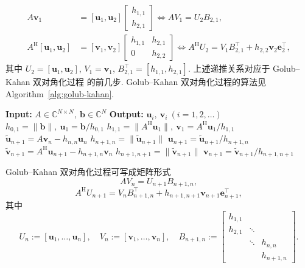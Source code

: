 \[\begin{aligned}A\bm v_1&=[\bm u_1,\bm u_2]\begin{bmatrix}h_{1,1}\\h_{2,1}\end{bmatrix}\Leftrightarrow AV_1=U_2B_{2,1},\\
A^{\mathrm H}[\bm u_1,\bm u_2]&=[\bm v_1,\bm v_2]\begin{bmatrix}h_{1,1}&h_{2,1}\\0&h_{2,2}\end{bmatrix}\Leftrightarrow A^{\mathrm H}U_2=V_1B_{2,1}^{\top}+h_{2,2}\bm v_2\bm e_2^{\top},\end{aligned}\]
{其中 $U_2=[\bm u_1,\bm u_2]$, $V_1=\bm v_1$, $B_{2,1}^{\top}=[h_{1,1},h_{2,1}]$. 上述递推关系对应于 Golub--Kahan 双对角化过程  的前几步. Golub--Kahan 双对角化过程的算法见 Algorithm\ \ref{alg:golub-kahan}.}
\begin{algorithm}[H]\caption{{Golub--Kahan 双对角化过程}}\label{alg:golub-kahan}\begin{algorithmic}[1]
\Statex\textbf{Input:} $A\in\mathbb C^{N\times N},\ \bm b\in\mathbb C^N$
\Statex\textbf{Output:} $\bm u_i,\ \bm v_i\ (i=1,2,\ldots)$
\State $h_{0,1}=\|\bm b\|,\ \bm u_1=\bm b/h_{0,1}$
\State $h_{1,1}=\|A^{\mathrm H}\bm u_1\|,\ \bm v_1=A^{\mathrm H}\bm u_1/h_{1,1}$
\State $\widetilde{\bm u}_{n+1}=A\bm v_n-h_{n,n}\bm u_n$
\State $h_{n+1,n}=\|\widetilde{\bm u}_{n+1}\|$
\State $\bm u_{n+1}=\widetilde{\bm u}_{n+1}/h_{n+1,n}$
\State $\widetilde{\bm v}_{n+1}=A^{\mathrm H}\bm u_{n+1}-h_{n+1,n}\bm v_n$
\State $h_{n+1,n+1}=\|\widetilde{\bm v}_{n+1}\|$
\State $\bm v_{n+1}=\widetilde{\bm v}_{n+1}/h_{n+1,n+1}$
\EndFor\end{algorithmic}\end{algorithm}
{Golub--Kahan 双对角化过程可写成矩阵形式}
\begin{equation}\label{eq:golub-kahan-matrix-forward}AV_n=U_{n+1}B_{n+1,n},\end{equation}
\[A^{\mathrm H}U_{n+1}=V_nB_{n+1,n}^{\top}+h_{n+1,n+1}\bm v_{n+1}\bm e_{n+1}^{\top},\]
{其中}
\[U_n:=[\bm u_1,\ldots,\bm u_n],\quad V_n:=[\bm v_1,\ldots,\bm v_n],\quad B_{n+1,n}:=\begin{bmatrix}h_{1,1}&&\\h_{2,1}&\ddots&\\&\ddots&h_{n,n}\\&&h_{n+1,n}\end{bmatrix}.\]
